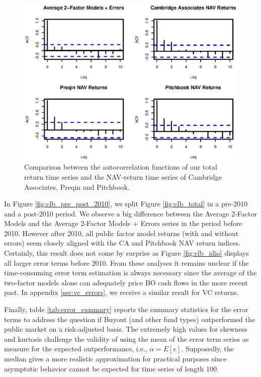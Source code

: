 \documentclass[12pt]{article}
\begin{document}
\begin{figure}[H]
	\centering
	\includegraphics{Figures/ACFunBO}
	\caption{
		Comparison between the autocorrelation functions of our total return time series and the NAV-return time series of Cambridge Associates, Preqin and Pitchbook.
	}
	\label{fig:autocorrelation}
\end{figure}

In Figure \ref{fig:clb_pre_post_2010}, we split Figure \ref{fig:clb_total} in a pre-2010 and a post-2010 period.
We observe a big difference between the Average 2-Factor Models and the Average 2-Factor Models + Errors series in the period before 2010.
However after 2010, all public factor model returns (with and without errors) seem closely aligned with the CA and Pitchbook NAV return indices.
Certainly, this result does not come by surprise as Figure \ref{fig:clb_idio} displays all larger error terms before 2010.
From these analyses it remains unclear if the time-consuming error term estimation is always necessary since the average of the two-factor models alone can adequately price BO cash flows in the more recent past.
In appendix \ref{sec:vc_errors}, we receive a similar result for VC returns.

Finally, table \ref{tab:error_summary} reports the summary statistics for the error terms to address the question if Buyout (and other fund types) outperformed the public market on a risk-adjusted basis.
The extremely high values for skewness and kurtosis challenge the validity of using the mean of the error term series as measure for the expected outperformance, i.e., $\alpha = E [ e ]$.
Supposedly, the median gives a more realistic approximation for practical purposes since asymptotic behavior cannot be expected for time series of length 100.
\end{document}
